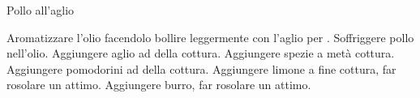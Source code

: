 \begin{recipe}{Pollo all'aglio}
    \begin{header}

    \end{header}

    \begin{ingredients}
        
        
    \end{ingredients}

    \begin{preparation}
        \step Aromatizzare l'olio facendolo bollire leggermente con l'aglio per .
        \step Soffriggere pollo nell'olio.
        \step Aggiungere aglio ad  della cottura.
        \step Aggiungere spezie a metà cottura.
        \step Aggiungere pomodorini ad  della cottura.
        \step Aggiungere limone a fine cottura, far rosolare un attimo.
        \step Aggiungere burro, far rosolare un attimo.
    \end{preparation}
\end{recipe}
